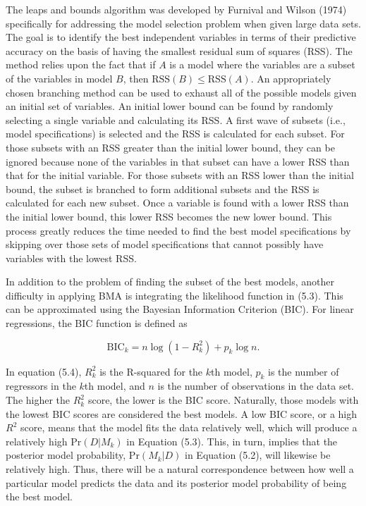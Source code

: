 The leaps and bounds algorithm was developed by Furnival and Wilson (1974) specifically for addressing the model selection problem when given large data sets.  The goal is to identify the best independent variables in terms of their predictive accuracy on the basis of having the smallest residual sum of squares (RSS).  The method relies upon the fact that if $A$ is a model where the variables are a subset of the variables in model $B$, then $\mbox{RSS}(B)\leq \mbox{RSS}(A)$.  An appropriately chosen branching method can be used to exhaust all of the possible models given an initial set of variables.  An initial lower bound can be found by randomly selecting a single variable and calculating its RSS.  A first wave of subsets (i.e., model specifications) is selected and the RSS is calculated for each subset.  For those subsets with an RSS greater than the initial lower bound, they can be ignored because none of the variables in that subset can have a lower RSS than that for the initial variable.  For those subsets with an RSS lower than the initial bound, the subset is branched to form additional subsets and the RSS is calculated for each new subset.  Once a variable is found with a lower RSS than the initial lower bound, this lower RSS becomes the new lower bound.  This process greatly reduces the time needed to find the best model specifications by skipping over those sets of model specifications that cannot possibly have variables with the lowest RSS.

In addition to the problem of finding the subset of the best models, another difficulty in applying BMA is integrating the likelihood function in (5.3).  This can be approximated using the Bayesian Information Criterion (BIC).  For linear regressions, the BIC function is defined as

\begin{equation}
\mbox{BIC}_k = n\log(1-R^2_k)+p_k\log n.
\end{equation}

In equation (5.4), $R^2_k$ is the R-squared for the $k$th model, $p_k$ is the number of regressors in the $k$th model, and $n$ is the number of observations in the data set. The higher the $R^2_k$ score, the lower is the BIC score.  Naturally, those models with the lowest BIC scores are considered the best models.  A low BIC score, or a high $R^2$ score, means that the model fits the data relatively well, which will produce a relatively high $\mbox{Pr}(D|M_k)$ in Equation (5.3).  This, in turn, implies that the posterior model probability, $\mbox{Pr}(M_k|D)$ in Equation (5.2), will likewise be relatively high.  Thus, there will be a natural correspondence between how well a particular model predicts the data and its posterior model probability of being the best model.

